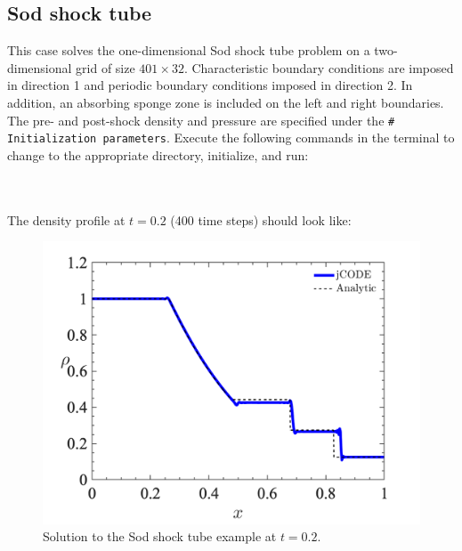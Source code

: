 \documentclass[12pt]{article}
\newcommand{\code}[1]{\texttt{#1}}
\begin{document}
\subsection{Sod shock tube}
This case solves the one-dimensional Sod shock tube problem on a two-dimensional grid of size $401\times 32$. Characteristic boundary conditions are imposed in direction 1 and periodic boundary conditions imposed in direction 2. In addition, an absorbing sponge zone is included on the left and right boundaries. The pre- and post-shock density and pressure are specified under the \code{\# Initialization parameters}. Execute the following commands in the terminal to change to the appropriate directory, initialize, and run:
\\\\
\vspace{1em}
\vspace{.5em}
\\
The density profile at $t=0.2$ (400 time steps) should look like:
 \begin{figure}[h]
	\begin{center}
		\includegraphics[scale=0.5]{fig/sod_shock}
		\caption{Solution to the Sod shock tube example at $t=0.2$.}
		\label{fig:sod}
	\end{center}
\end{figure}
\end{document}

